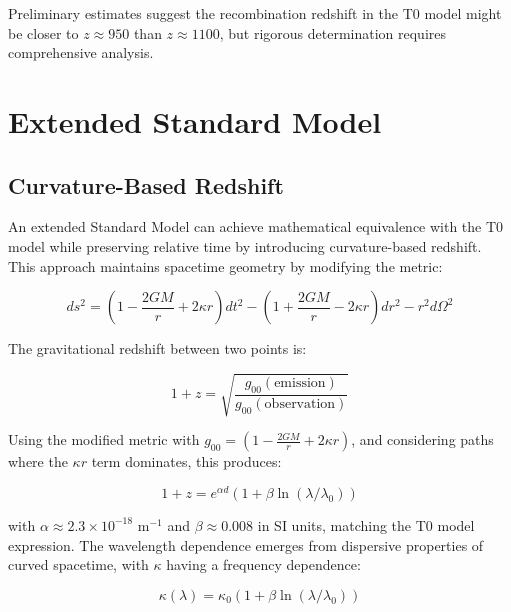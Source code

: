 \documentclass[aps,prl,twocolumn,superscriptaddress,nofootinbib]{revtex4-2}
\begin{document}
	Preliminary estimates suggest the recombination redshift in the T0 model might be closer to $z \approx 950$ than $z \approx 1100$, but rigorous determination requires comprehensive analysis.
	
	\section{Extended Standard Model}
	\label{sec:extended_sm}
	
	\subsection{Curvature-Based Redshift}
	\label{subsec:curvature_redshift}
	
	An extended Standard Model can achieve mathematical equivalence with the T0 model while preserving relative time by introducing curvature-based redshift. This approach maintains spacetime geometry by modifying the metric:
	
	\begin{equation}
		ds^2 = (1 - \frac{2GM}{r} + 2\kappa r)dt^2 - (1 + \frac{2GM}{r} - 2\kappa r)dr^2 - r^2d\Omega^2
		\label{eq:modified_metric}
	\end{equation}
	
	The gravitational redshift between two points is:
	
	\begin{equation}
		1 + z = \sqrt{\frac{g_{00}(\text{emission})}{g_{00}(\text{observation})}}
		\label{eq:grav_redshift}
	\end{equation}
	
	Using the modified metric with $g_{00} = (1 - \frac{2GM}{r} + 2\kappa r)$, and considering paths where the $\kappa r$ term dominates, this produces:
	
	\begin{equation}
		1 + z = e^{\alpha d}(1 + \beta \ln(\lambda/\lambda_0))
		\label{eq:extended_redshift}
	\end{equation}
	
	with $\alpha \approx 2.3 \times 10^{-18}$ m$^{-1}$ and $\beta \approx 0.008$ in SI units, matching the T0 model expression. The wavelength dependence emerges from dispersive properties of curved spacetime, with $\kappa$ having a frequency dependence:
	
	\begin{equation}
		\kappa(\lambda) = \kappa_0(1 + \beta \ln(\lambda/\lambda_0))
		\label{eq:kappa_wavelength}
	\end{equation}
	
\end{document}
